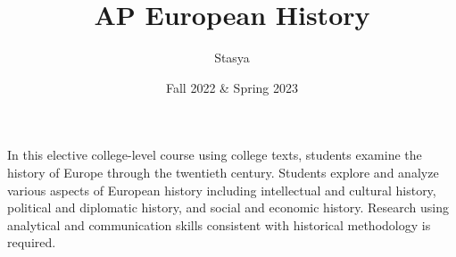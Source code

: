 \documentclass[10pt,a4paper,oneside]{book}
\title{AP European History}
\author{Stasya}
\date{Fall 2022 \& Spring 2023}
\begin{document}
\maketitle
\bigbreak
\begin{center}
    In this elective college-level course using college texts, students examine the history of Europe through the twentieth 
    century.  Students explore and analyze various aspects of European history including intellectual and cultural history, 
    political and diplomatic history, and social and economic history.  Research using analytical and communication skills 
    consistent with historical methodology is required.
\end{center}
\bigbreak
\tableofcontents









\end{document}
